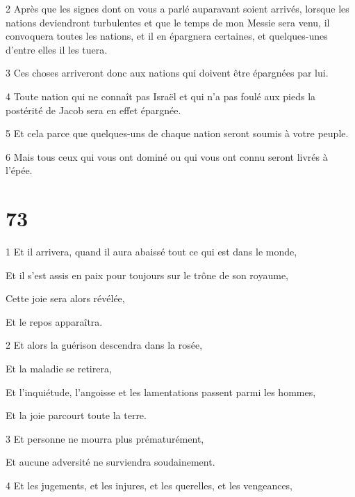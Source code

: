 \par 2 Après que les signes dont on vous a parlé auparavant soient arrivés, lorsque les nations deviendront turbulentes et que le temps de mon Messie sera venu, il convoquera toutes les nations, et il en épargnera certaines, et quelques-unes d'entre elles il les tuera.

\par 3 Ces choses arriveront donc aux nations qui doivent être épargnées par lui.

\par 4 Toute nation qui ne connaît pas Israël et qui n'a pas foulé aux pieds la postérité de Jacob sera en effet épargnée.

\par 5 Et cela parce que quelques-uns de chaque nation seront soumis à votre peuple.

\par 6 Mais tous ceux qui vous ont dominé ou qui vous ont connu seront livrés à l'épée.

\chapter{73}

\par 1 Et il arrivera, quand il aura abaissé tout ce qui est dans le monde,

\par Et il s'est assis en paix pour toujours sur le trône de son royaume,

\par Cette joie sera alors révélée,

\par Et le repos apparaîtra.

\par 2 Et alors la guérison descendra dans la rosée,

\par Et la maladie se retirera,

\par Et l'inquiétude, l'angoisse et les lamentations passent parmi les hommes,

\par Et la joie parcourt toute la terre.

\par 3 Et personne ne mourra plus prématurément,

\par Et aucune adversité ne surviendra soudainement.

\par 4 Et les jugements, et les injures, et les querelles, et les vengeances,

